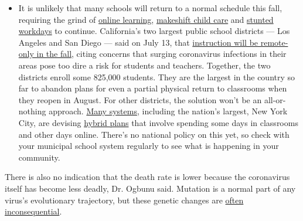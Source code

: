 \begin{itemize}
  \begin{itemize}
  \tightlist
  \item
    It is unlikely that many schools will return to a normal schedule
    this fall, requiring the grind of
    \href{https://www.nytimes.com/2020/06/05/us/coronavirus-education-lost-learning.html?action=click\&pgtype=Article\&state=default\&region=MAIN_CONTENT_3\&context=storylines_faq}{online
    learning},
    \href{https://www.nytimes.com/2020/05/29/us/coronavirus-child-care-centers.html?action=click\&pgtype=Article\&state=default\&region=MAIN_CONTENT_3\&context=storylines_faq}{makeshift
    child care} and
    \href{https://www.nytimes.com/2020/06/03/business/economy/coronavirus-working-women.html?action=click\&pgtype=Article\&state=default\&region=MAIN_CONTENT_3\&context=storylines_faq}{stunted
    workdays} to continue. California's two largest public school
    districts --- Los Angeles and San Diego --- said on July 13, that
    \href{https://www.nytimes.com/2020/07/13/us/lausd-san-diego-school-reopening.html?action=click\&pgtype=Article\&state=default\&region=MAIN_CONTENT_3\&context=storylines_faq}{instruction
    will be remote-only in the fall}, citing concerns that surging
    coronavirus infections in their areas pose too dire a risk for
    students and teachers. Together, the two districts enroll some
    825,000 students. They are the largest in the country so far to
    abandon plans for even a partial physical return to classrooms when
    they reopen in August. For other districts, the solution won't be an
    all-or-nothing approach.
    \href{https://bioethics.jhu.edu/research-and-outreach/projects/eschool-initiative/school-policy-tracker/}{Many
    systems}, including the nation's largest, New York City, are
    devising
    \href{https://www.nytimes.com/2020/06/26/us/coronavirus-schools-reopen-fall.html?action=click\&pgtype=Article\&state=default\&region=MAIN_CONTENT_3\&context=storylines_faq}{hybrid
    plans} that involve spending some days in classrooms and other days
    online. There's no national policy on this yet, so check with your
    municipal school system regularly to see what is happening in your
    community.
  \end{itemize}
\end{itemize}

There is also no indication that the death rate is lower because the
coronavirus itself has become less deadly, Dr. Ogbunu said. Mutation is
a normal part of any virus's evolutionary trajectory, but these genetic
changes are
\href{https://undark.org/2020/05/14/covid-19-evolution-mutation/}{often
inconsequential}.

